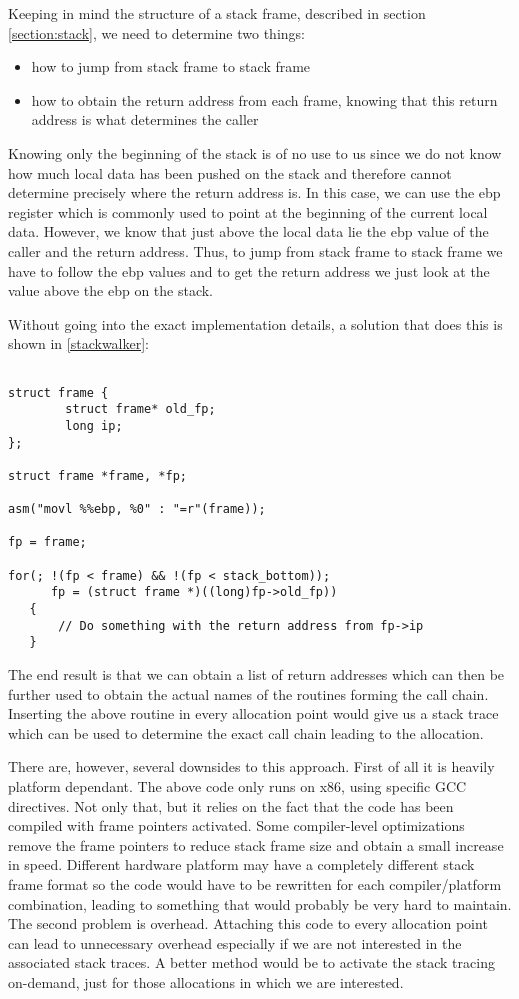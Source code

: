Keeping in mind the structure of a stack frame, described in section \ref{section:stack}, we need to determine two things:
\begin{itemize}
\item how to jump from stack frame to stack frame
\item how to obtain the return address from each frame, knowing that this return address is what determines the caller
\end{itemize}

Knowing only the beginning of the stack is of no use to us since we do not know how much local data has been pushed on the stack and therefore cannot determine precisely where the return address is. In this case, we can use the ebp register which is commonly used to point at the beginning of the current local data. However, we know that just above the local data lie the ebp value of the caller and the return address. Thus, to jump from stack frame to stack frame we have to follow the ebp values and to get the return address we just look at the value above the ebp on the stack.

Without going into the exact implementation details, a solution that does this is shown in \ref{stackwalker}:
\begin{lstlisting}[label=stackwalker,caption=Simple stack walker for x86]

struct frame {
        struct frame* old_fp;
        long ip;
};

struct frame *frame, *fp;

asm("movl %%ebp, %0" : "=r"(frame));

fp = frame;

for(; !(fp < frame) && !(fp < stack_bottom));
      fp = (struct frame *)((long)fp->old_fp))
   {
       // Do something with the return address from fp->ip
   }
\end{lstlisting}

The end result is that we can obtain a list of return addresses which can then be further used to obtain the actual names of the routines forming the call chain. Inserting the above routine in every allocation point would give us a stack trace which can be used to determine the exact call chain leading to the allocation.

There are, however, several downsides to this approach. First of all it is heavily platform dependant. The above code only runs on x86, using specific GCC directives. Not only that, but it relies on the fact that the code has been compiled with frame pointers activated. Some compiler-level optimizations remove the frame pointers to reduce stack frame size and obtain a small increase in speed. Different hardware platform may have a completely different stack frame format so the code would have to be rewritten for each compiler/platform combination, leading to something that would probably be very hard to maintain. The second problem is overhead. Attaching this code to every allocation point can lead to unnecessary overhead especially if we are not interested in the associated stack traces. A better method would be to activate the stack tracing on-demand, just for those allocations in which we are interested.

